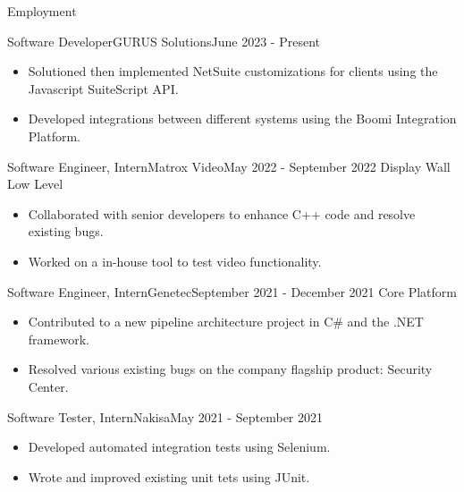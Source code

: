 \documentclass[]{mcdowellcv}
\begin{document}
	\makeheader
	
	\begin{cvsection}{Employment}
		\begin{cvsubsection}{Software Developer}{GURUS Solutions}{June 2023 - Present}
			\begin{itemize}
                \item Solutioned then implemented NetSuite customizations for clients using the Javascript SuiteScript API.
                \item Developed integrations between different systems using the Boomi Integration Platform.
			\end{itemize}
		\end{cvsubsection}

		\begin{cvsubsection}{Software Engineer, Intern}{Matrox Video}{May 2022 - September 2022}
		    Display Wall Low Level	
			\begin{itemize}
                \item Collaborated with senior developers to enhance C++ code and resolve existing bugs.
                \item Worked on a in-house tool to test video functionality.
			\end{itemize}
		\end{cvsubsection}
		
		\begin{cvsubsection}{Software Engineer, Intern}{Genetec}{September 2021 - December 2021}	
            Core Platform
			\begin{itemize}
                \item Contributed to a new pipeline architecture project in C\# and the .NET framework.
                \item Resolved various existing bugs on the company flagship product: Security Center.
			\end{itemize}
		\end{cvsubsection}
		
		\begin{cvsubsection}{Software Tester, Intern}{Nakisa}{May 2021 - September 2021}		
			\begin{itemize}
                \item Developed automated integration tests using Selenium.
                \item Wrote and improved existing unit tets using JUnit.
			\end{itemize}
		\end{cvsubsection}
	\end{cvsection}
	
\end{document}
